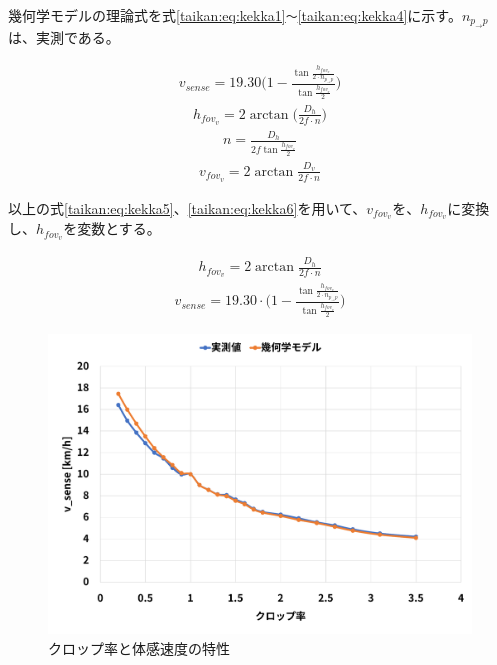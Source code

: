幾何学モデルの理論式を式\eqref{taikan:eq:kekka1}\verb|～|\eqref{taikan:eq:kekka4}に示す。$n_{p_{\to}p}$は、実測である。

\begin{align}
  v_{sense} = 19.30\Bigg(1-\frac{\tan\frac{h_{fov_v}}{2\cdot n_{p_{\to}p}}}{\tan\frac{h_{fov_v}}{2}}\Bigg) \label{taikan:eq:kekka1}
\end{align}
\begin{align}
  h_{fov_v} = 2\arctan\Bigg(\frac{D_h}{2f\cdot n}\Bigg) \label{taikan:eq:kekka2}
\end{align}
\begin{align}
  n = \frac{D_h}{2f\tan\frac{h_{fov_v}}{2}} \label{taikan:eq:kekka3}
\end{align}
\begin{align}
  v_{fov_v} = 2\arctan\frac{D_v}{2f\cdot n} \label{taikan:eq:kekka4}
\end{align}

以上の式\eqref{taikan:eq:kekka5}、\eqref{taikan:eq:kekka6}を用いて、$v_{fov_v}$を、$h_{fov_v}$に変換し、$h_{fov_v}$を変数とする。

\begin{align}
  h_{fov_v} = 2\arctan\frac{D_h}{2f\cdot n} \label{taikan:eq:kekka5}
\end{align}
\begin{align}
  v_{sense} = 19.30\cdot \Bigg(1-\frac{\tan\frac{h_{fov_v}}{2\cdot n_{p_{\to}p}}}{\tan{\frac{h_{fov_v}}{2}}}\Bigg) \label{taikan:eq:kekka6}
\end{align}

\begin{figure}[h]
  \begin{center}
  \includegraphics[width=.85\linewidth]{img/20.pdf}
  \caption{クロップ率と体感速度の特性}
  \label{taikan:kekka2}
  \end{center}
\end{figure}

